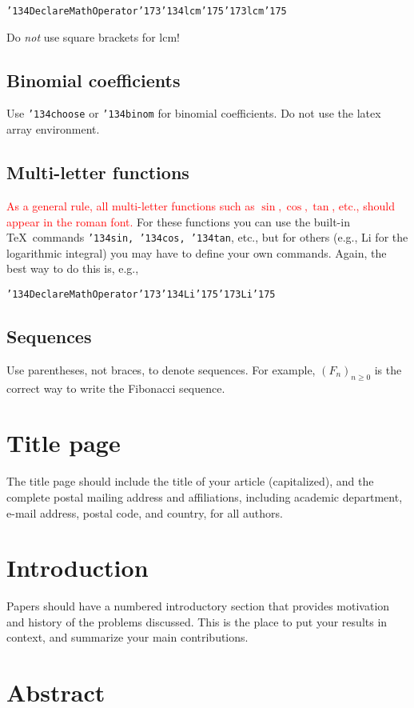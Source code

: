 \documentclass[12pt,reqno]{article}
\begin{document}
{\tt \char'134DeclareMathOperator\char'173\char'134lcm\char'175\char'173lcm\char'175}

Do {\it not\/} use square brackets for lcm!

\subsection{Binomial coefficients}

      Use {\tt\char'134choose} or {\tt\char'134binom}
for binomial coefficients.  
Do not use the latex array environment.

\subsection{Multi-letter functions}

     \textcolor{red}{As a general rule, all multi-letter functions such as $\sin, \cos, \tan$, etc., should appear in the roman font.}  For these functions you can use
the built-in \TeX\ commands {\tt\char'134sin, \char'134cos, \char'134tan}, etc.,
but for others (e.g., {\rm Li} for the logarithmic integral)
you may have to define your own commands.  Again, the best way to do this
is, e.g., 

{\tt \char'134DeclareMathOperator\char'173\char'134Li\char'175\char'173Li\char'175}

\subsection{Sequences}

Use parentheses, not braces, to denote sequences.  For example,
$(F_n)_{n \geq 0}$ is the correct way to write the Fibonacci sequence.


\section{Title page}

The title page should include the title of your article (capitalized),
and the complete postal mailing address and affiliations, including academic
department, e-mail address, postal code, and country,
for all authors.  



\section{Introduction}

Papers should have a numbered introductory section that provides motivation and
history of the problems discussed.  This is the place to put your results
in context, and summarize your main contributions.

\section{Abstract}
\end{document}
